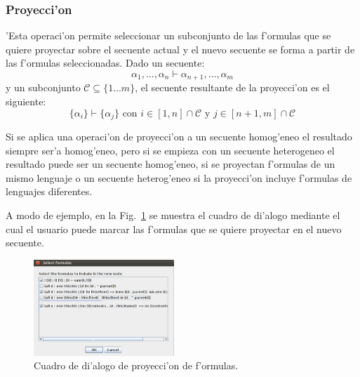 \subsubsection{Proyecci'on}

'Esta operaci'on  permite seleccionar un subconjunto de las f'ormulas que se quiere proyectar sobre el secuente actual y el nuevo secuente se forma a partir de las f'ormulas seleccionadas.
Dado un secuente:
$$ \alpha_1,\ldots,\alpha_n \vdash \alpha_{n+1},\ldots,\alpha_m $$
y un subconjunto $\mathcal{C} \subseteq \{1 \ldots m\}$, el secuente resultante de la proyecci'on es el siguiente:
$$\{\alpha_i \} \vdash \{\alpha_j\} \mbox{ con }i\in [1,n]\cap\mathcal{C} \mbox{ y } j\in [n+1, m]\cap\mathcal{C}$$

Si se aplica una operaci'on de proyecci'on a un secuente homog'eneo el resultado siempre ser'a homog'eneo, pero si se empieza con un secuente heterogeneo el resultado puede ser un secuente homog'eneo, si se proyectan f'ormulas de un mismo lenguaje o un secuente heterog'eneo si la proyecci'on incluye f'ormulas de lenguajes diferentes.

A modo de ejemplo, en la Fig.~\ref{seq selection}  se muestra el cuadro de di'alogo mediante el cual el usuario puede marcar las f'ormulas que se quiere proyectar en el nuevo secuente.

\begin{figure}[tb]
	\includegraphics[width=200px]{img/select.png}
	\centering
	\caption{Cuadro de di'alogo de proyecci'on de f'ormulas.}
        \label{seq selection}
\end{figure}


